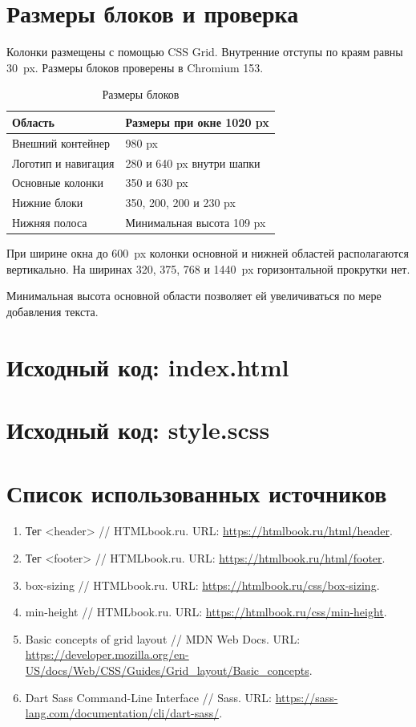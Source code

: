 \documentclass[14pt,a4paper]{extarticle}
\newcommand{\listing}[1]{\begingroup\singlespacing\setlength{\topsep}{0pt}\setlength{\partopsep}{0pt}\endgroup}
\begin{document}
\clearpage
\section{Размеры блоков и проверка}
Колонки размещены с помощью CSS Grid. Внутренние отступы по краям равны 30~px. Размеры блоков проверены в Chromium 153.
\begin{table}[H]
\caption{Размеры блоков}
\begingroup\fontsize{12}{14}\selectfont\singlespacing
\renewcommand{\arraystretch}{1.25}
\begin{tabularx}{\textwidth}{|Y|Y|}
\hline
Область & Размеры при окне 1020 px\\ \hline
Внешний контейнер & 980 px\\ \hline
Логотип и навигация & 280 и 640 px внутри шапки\\ \hline
Основные колонки & 350 и 630 px\\ \hline
Нижние блоки & 350, 200, 200 и 230 px\\ \hline
Нижняя полоса & Минимальная высота 109 px\\ \hline
\end{tabularx}
\endgroup
\end{table}

При ширине окна до 600~px колонки основной и нижней областей располагаются вертикально. На ширинах 320, 375, 768 и 1440~px горизонтальной прокрутки нет.

Минимальная высота основной области позволяет ей увеличиваться по мере добавления текста.


\clearpage
\section{Исходный код: index.html}
\listing{index.html}

\clearpage
\section{Исходный код: style.scss}
\listing{style.scss}
\clearpage
\section*{Список использованных источников}
\begin{enumerate}[label=\arabic*.,leftmargin=8mm,itemsep=8pt,parsep=0pt]
\item Тег <header> // HTMLbook.ru. URL: \url{https://htmlbook.ru/html/header}.
\item Тег <footer> // HTMLbook.ru. URL: \url{https://htmlbook.ru/html/footer}.
\item box-sizing // HTMLbook.ru. URL: \url{https://htmlbook.ru/css/box-sizing}.
\item min-height // HTMLbook.ru. URL: \url{https://htmlbook.ru/css/min-height}.
\item Basic concepts of grid layout // MDN Web Docs. URL: \url{https://developer.mozilla.org/en-US/docs/Web/CSS/Guides/Grid_layout/Basic_concepts}.
\item Dart Sass Command-Line Interface // Sass. URL: \url{https://sass-lang.com/documentation/cli/dart-sass/}.
\end{enumerate}
\end{document}

